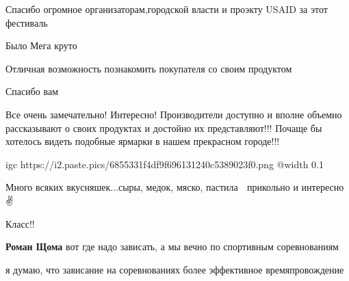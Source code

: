 
Спасибо огромное организаторам,городской власти и проэкту USAID за этот фестиваль

Было Мега круто

Отличная возможность познакомить покупателя со своим продуктом

Спасибо вам


Все очень замечательно! Интересно! Производители доступно и вполне объемно
рассказывают о своих продуктах и достойно их представляют!!! Почаще бы хотелось
видеть подобные ярмарки в нашем прекрасном городе!!!


\ifcmt
  igc https://i2.paste.pics/6855331f4df9f696131240c5389023f0.png
	@width 0.1
\fi


Много всяких вкусняшек...сыры, медок, мяско, пастила 🥰 прикольно и интересно ✌️💯🤩


Класс!!

\textbf{Роман Щома} вот где надо зависать, а мы вечно по спортивным соревнованиям 🤣

\begin{itemize} %

я думаю, что зависание на соревнованиях более эффективное времяпровождение
\end{itemize} %
